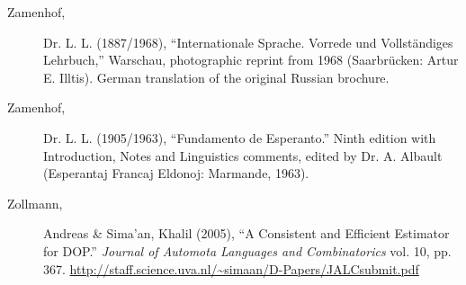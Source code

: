 \documentclass[10pt,a4paper]{article}
\begin{document}
\begin{description}
\item[Zamenhof,] Dr. L. L. (1887/1968), ``Internationale Sprache. Vorrede und
Vollst\"andiges Lehrbuch,'' Warschau, photographic reprint from 1968
(Saarbr\"ucken: Artur E. Illtis). German translation of the original Russian
brochure.

\item[Zamenhof,] Dr. L. L. (1905/1963), ``Fundamento de Esperanto.'' Ninth
edition with Introduction, Notes and Linguistics comments, edited by Dr. A.
Albault (Esperantaj Francaj Eldonoj: Marmande, 1963).

\item[Zollmann,] Andreas \& Sima'an, Khalil (2005), ``A Consistent and Efficient
Estimator for DOP.''  {\em Journal of Automota Languages and Combinatorics} vol.
10, pp. 367.  \url{http://staff.science.uva.nl/~simaan/D-Papers/JALCsubmit.pdf}

\end{description}
\end{document}
